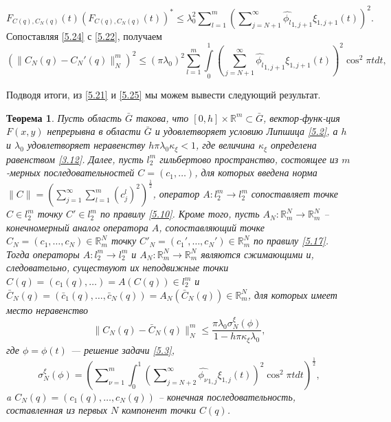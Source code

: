 \documentclass{article}
\numberwithin{equation}{section}
\theoremstyle{plain}
\newtheorem{theorem}{Теорема}
\theoremstyle{definition}
\begin{document}
\begin{fulltext}
\begin{equation}
F_{C(q),C_N(q)}(t)(F_{C(q),C_N(q)}(t))^*\le \lambda_0^2   \sum\nolimits_{l=1}^m \left(\sum\nolimits_{j=N+1}^\infty  \widehat {\phi_l}_{1,j+1}\xi_{1,j+1}(t)\right)^2.
\end{equation}
Сопоставляя \eqref{5.24} с \eqref{5.22}, получаем
\begin{equation}\label{5.25}
(\|C_N(q)- C_N'(q)\|_N^m)^2\le (\pi\lambda_0)^2\sum_{l=1}^m\int\limits_{0}^1\left(\sum_{j=N+1}^\infty \widehat {\phi_l}_{1,j+1}\xi_{1,j+1}(t)\right)^2\cos^2\pi t dt,
\end{equation}







Подводя итоги, из \eqref{5.21} и \eqref{5.25}  мы можем вывести следующий результат.
\begin{theorem}\label{th2} Пусть область $\bar G$ такова, что $[0,h]\times\mathbb{R}^m\subset \bar G$, вектор-функ-\linebreak ция $F(x,y)$ непрерывна в области $\bar G$ и удовлетворяет условию Липшица \eqref{5.2}, а $h$ и $\lambda_0$ удовлетворяет неравенству $h\pi\lambda_0\kappa_\xi<1$, где величина $\kappa_\xi$ определена равенством \eqref{3.12}. Далее, пусть $l_2^m$ гильбертово пространство, состоящее из $m$-мерных последовательностей $C=(c_1,\ldots)$, для которых введена норма $\|C\|=\left(\sum\nolimits_{j=1}^{\infty} \sum\nolimits_{l=1}^{m}(c_j^l)^2\right)^\frac12$,   оператор $A: l_2^m\to l_2^m$ сопоставляет точке $C\in l_2^m$ точку $C'\in l_2^m$ по правилу \eqref{5.10}. Кроме того, пусть $A_N:\mathbb{R}^N_m\to \mathbb{R}^N_m$ -- конечномерный аналог оператора $A$, сопоставляющий точке $C_N=(c_1,\ldots,c_{N})\in \mathbb{R}^N_m $ точку  $C'_N=(c_1',\ldots,c_{N}')\in \mathbb{R}^N_m $ по правилу \eqref{5.17}.
Тогда операторы $A: l_2^m\to l_2^m$ и $A_N:\mathbb{R}^N_m\to \mathbb{R}^N_m$ являются сжимающими и, следовательно, существуют  их неподвижные точки $C(q)=(c_1(q),\ldots)=A(C(q))\in l_2^m$ и $\bar C_N(q)=(\bar c_1(q),\ldots,\bar c_{N}(q))=A_N(\bar C_N(q))\in \mathbb{R}^N_m$, для которых имеет место неравенство
\begin{equation}\label{5.26}
\|C_N(q)-\bar C_N(q)\|_N^m\le \frac{\pi\lambda_0 \sigma_N^\xi(\phi)}{1-h\pi\kappa_\xi\lambda_0},
\end{equation}
где $\phi=\phi(t)$ --- решение задачи \eqref{5.3},
\begin{equation}\label{5.27}
\sigma_N^\xi(\phi)=\left(\sum\nolimits_{\nu=1}^m\int_{0}^1\left(\sum\nolimits_{j=N+2}^\infty \widehat {\phi_\nu}_{1,j}\xi_{1,j}(t)\right)^2\cos^2\pi t dt\right)^\frac12,
\end{equation}
 a $C_N(q)=(c_1(q),\ldots,c_{N}(q))$ -- конечная последовательность, составленная из первых $N$ компонент точки  $C(q)$.
\end{theorem}


\end{fulltext}
\end{document}
